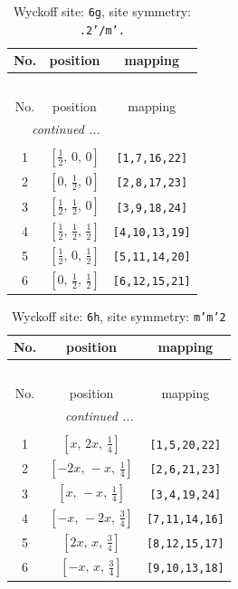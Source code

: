 \documentclass[fleqn,8pt]{jsarticle}
\begin{document}
\renewcommand{\arraystretch}{1.2}
\begin{longtable}{ccc}
\caption{Wyckoff site: {\tt 6g}, site symmetry: {\tt .2'/m'.}}
 \\
 \hline \hline
No. & position & mapping \\ \hline \endfirsthead

\multicolumn{2}{l}{\tablename\ \thetable{}} \\
 \hline \hline
No. & position & mapping \\ \hline \endhead

 \hline \hline
\multicolumn{2}{r}{\footnotesize\it continued ...} \\ \endfoot

 \hline \hline
\multicolumn{2}{r}{} \\ \endlastfoot

1 & $\left[ \frac{1}{2},\, 0,\, 0 \right]$ & {\tt [1,7,16,22]} \\ \hline
2 & $\left[ 0,\, \frac{1}{2},\, 0 \right]$ & {\tt [2,8,17,23]} \\ \hline
3 & $\left[ \frac{1}{2},\, \frac{1}{2},\, 0 \right]$ & {\tt [3,9,18,24]} \\ \hline
4 & $\left[ \frac{1}{2},\, \frac{1}{2},\, \frac{1}{2} \right]$ & {\tt [4,10,13,19]} \\ \hline
5 & $\left[ \frac{1}{2},\, 0,\, \frac{1}{2} \right]$ & {\tt [5,11,14,20]} \\ \hline
6 & $\left[ 0,\, \frac{1}{2},\, \frac{1}{2} \right]$ & {\tt [6,12,15,21]} \\
\end{longtable}
\renewcommand{\arraystretch}{1.2}
\begin{longtable}{ccc}
\caption{Wyckoff site: {\tt 6h}, site symmetry: {\tt m'm'2}}
 \\
 \hline \hline
No. & position & mapping \\ \hline \endfirsthead

\multicolumn{2}{l}{\tablename\ \thetable{}} \\
 \hline \hline
No. & position & mapping \\ \hline \endhead

 \hline \hline
\multicolumn{2}{r}{\footnotesize\it continued ...} \\ \endfoot

 \hline \hline
\multicolumn{2}{r}{} \\ \endlastfoot

1 & $\left[ x,\, 2 x,\, \frac{1}{4} \right]$ & {\tt [1,5,20,22]} \\ \hline
2 & $\left[ - 2 x,\, - x,\, \frac{1}{4} \right]$ & {\tt [2,6,21,23]} \\ \hline
3 & $\left[ x,\, - x,\, \frac{1}{4} \right]$ & {\tt [3,4,19,24]} \\ \hline
4 & $\left[ - x,\, - 2 x,\, \frac{3}{4} \right]$ & {\tt [7,11,14,16]} \\ \hline
5 & $\left[ 2 x,\, x,\, \frac{3}{4} \right]$ & {\tt [8,12,15,17]} \\ \hline
6 & $\left[ - x,\, x,\, \frac{3}{4} \right]$ & {\tt [9,10,13,18]} \\
\end{longtable}
\end{document}
